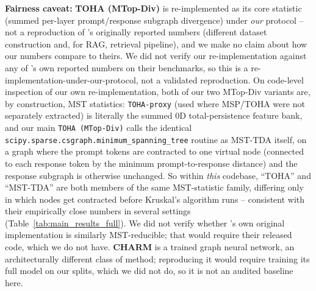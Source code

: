 \documentclass{article}
\begin{document}
\textbf{Fairness caveat:} \textbf{TOHA (MTop-Div)} is re-implemented as its core statistic (summed per-layer prompt/response subgraph divergence) under \emph{our} protocol -- not a reproduction of \citet{toha}'s originally reported numbers (different dataset construction and, for RAG, retrieval pipeline), and we make no claim about how our numbers compare to theirs. We did not verify our re-implementation against any of \citet{toha}'s own reported numbers on their benchmarks, so this is a re-implementation-under-our-protocol, not a validated reproduction. On code-level inspection of our own re-implementation, both of our two MTop-Div variants are, by construction, MST statistics: \texttt{TOHA-proxy} (used where MSP/TOHA were not separately extracted) is literally the summed $0$D total-persistence feature bank, and our main \texttt{TOHA (MTop-Div)} calls the identical \texttt{scipy.sparse.csgraph.minimum\_spanning\_tree} routine as MST-TDA itself, on a graph where the prompt tokens are contracted to one virtual node (connected to each response token by the minimum prompt-to-response distance) and the response subgraph is otherwise unchanged. So within \emph{this} codebase, ``TOHA'' and ``MST-TDA'' are both members of the same MST-statistic family, differing only in which nodes get contracted before Kruskal's algorithm runs -- consistent with their empirically close numbers in several settings (Table~\ref{tab:main_results_full}). We did not verify whether \citet{toha}'s own original implementation is similarly MST-reducible; that would require their released code, which we do not have. \textbf{CHARM} \citep{charm} is a trained graph neural network, an architecturally different class of method; reproducing it would require training its full model on our splits, which we did not do, so it is not an audited baseline here.
\end{document}
